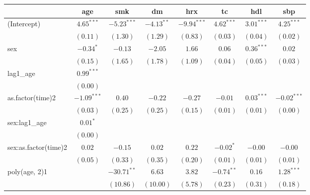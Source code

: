 
\begin{tabular}{l c c c c c c c}
\toprule
 & age & smk & dm & hrx & tc & hdl & sbp \\
\midrule
(Intercept)          & $4.65^{***}$  & $-5.23^{***}$ & $-4.13^{**}$ & $-9.94^{***}$ & $4.62^{***}$ & $3.01^{***}$  & $4.25^{***}$  \\
                     & $(0.11)$      & $(1.30)$      & $(1.29)$     & $(0.83)$      & $(0.03)$     & $(0.04)$      & $(0.02)$      \\
sex                  & $-0.34^{*}$   & $-0.13$       & $-2.05$      & $1.66$        & $0.06$       & $0.36^{***}$  & $0.02$        \\
                     & $(0.15)$      & $(1.65)$      & $(1.78)$     & $(1.09)$      & $(0.04)$     & $(0.05)$      & $(0.03)$      \\
lag1\_age            & $0.99^{***}$  &               &              &               &              &               &               \\
                     & $(0.00)$      &               &              &               &              &               &               \\
as.factor(time)2     & $-1.09^{***}$ & $0.40$        & $-0.22$      & $-0.27$       & $-0.01$      & $0.03^{***}$  & $-0.02^{***}$ \\
                     & $(0.03)$      & $(0.25)$      & $(0.25)$     & $(0.15)$      & $(0.01)$     & $(0.01)$      & $(0.00)$      \\
sex:lag1\_age        & $0.01^{*}$    &               &              &               &              &               &               \\
                     & $(0.00)$      &               &              &               &              &               &               \\
sex:as.factor(time)2 & $0.02$        & $-0.15$       & $0.02$       & $0.22$        & $-0.02^{*}$  & $-0.00$       & $-0.00$       \\
                     & $(0.05)$      & $(0.33)$      & $(0.35)$     & $(0.20)$      & $(0.01)$     & $(0.01)$      & $(0.01)$      \\
poly(age, 2)1        &               & $-30.71^{**}$ & $6.63$       & $3.82$        & $-0.74^{**}$ & $0.16$        & $1.28^{***}$  \\
                     &               & $(10.86)$     & $(10.00)$    & $(5.78)$      & $(0.23)$     & $(0.31)$      & $(0.18)$      \\

\end{tabular}
